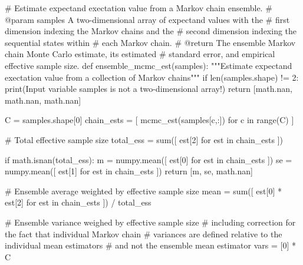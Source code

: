 \documentclass[
  letterpaper,
  DIV=11,
  numbers=noendperiod]{scrartcl}
\newenvironment{Shaded}{\begin{snugshade}}{\end{snugshade}}
\newcommand{\BuiltInTok}[1]{\textcolor[rgb]{0.00,0.23,0.31}{#1}}
\newcommand{\CommentTok}[1]{\textcolor[rgb]{0.37,0.37,0.37}{#1}}
\newcommand{\ControlFlowTok}[1]{\textcolor[rgb]{0.00,0.23,0.31}{#1}}
\newcommand{\DecValTok}[1]{\textcolor[rgb]{0.68,0.00,0.00}{#1}}
\newcommand{\KeywordTok}[1]{\textcolor[rgb]{0.00,0.23,0.31}{#1}}
\newcommand{\NormalTok}[1]{\textcolor[rgb]{0.00,0.23,0.31}{#1}}
\newcommand{\OperatorTok}[1]{\textcolor[rgb]{0.37,0.37,0.37}{#1}}
\newcommand{\StringTok}[1]{\textcolor[rgb]{0.13,0.47,0.30}{#1}}
\begin{document}
\begin{Shaded}
\begin{Highlighting}[]
\CommentTok{\# Estimate expectand exectation value from a Markov chain ensemble.}
\CommentTok{\# @param samples A two{-}dimensional array of expectand values with the }
\CommentTok{\#                first dimension indexing the Markov chains and the }
\CommentTok{\#                second dimension indexing the sequential states within }
\CommentTok{\#                each Markov chain.}
\CommentTok{\# @return The ensemble Markov chain Monte Carlo estimate, its estimated}
\CommentTok{\#         standard error, and empirical effective sample size.}
\KeywordTok{def}\NormalTok{ ensemble\_mcmc\_est(samples):}
  \CommentTok{"""Estimate expectand exectation value from a collection of }
\CommentTok{     Markov chains"""}
  \ControlFlowTok{if} \BuiltInTok{len}\NormalTok{(samples.shape) }\OperatorTok{!=} \DecValTok{2}\NormalTok{:}
    \BuiltInTok{print}\NormalTok{(}\StringTok{\textquotesingle{}Input variable \textasciigrave{}samples\textasciigrave{} is not a two{-}dimensional array!\textquotesingle{}}\NormalTok{)}
    \ControlFlowTok{return}\NormalTok{ [math.nan, math.nan, math.nan]}
    
\NormalTok{  C }\OperatorTok{=}\NormalTok{ samples.shape[}\DecValTok{0}\NormalTok{]}
\NormalTok{  chain\_ests }\OperatorTok{=}\NormalTok{ [ mcmc\_est(samples[c,:]) }\ControlFlowTok{for}\NormalTok{ c }\KeywordTok{in} \BuiltInTok{range}\NormalTok{(C) ]}
  
  \CommentTok{\# Total effective sample size}
\NormalTok{  total\_ess }\OperatorTok{=} \BuiltInTok{sum}\NormalTok{([ est[}\DecValTok{2}\NormalTok{] }\ControlFlowTok{for}\NormalTok{ est }\KeywordTok{in}\NormalTok{ chain\_ests ])}
  
  \ControlFlowTok{if}\NormalTok{ math.isnan(total\_ess):}
\NormalTok{    m  }\OperatorTok{=}\NormalTok{ numpy.mean([ est[}\DecValTok{0}\NormalTok{] }\ControlFlowTok{for}\NormalTok{ est }\KeywordTok{in}\NormalTok{ chain\_ests ])}
\NormalTok{    se }\OperatorTok{=}\NormalTok{ numpy.mean([ est[}\DecValTok{1}\NormalTok{] }\ControlFlowTok{for}\NormalTok{ est }\KeywordTok{in}\NormalTok{ chain\_ests ])}
    \ControlFlowTok{return}\NormalTok{ [m, se, math.nan]}
  
  \CommentTok{\# Ensemble average weighted by effective sample size}
\NormalTok{  mean }\OperatorTok{=} \BuiltInTok{sum}\NormalTok{([ est[}\DecValTok{0}\NormalTok{] }\OperatorTok{*}\NormalTok{ est[}\DecValTok{2}\NormalTok{] }\ControlFlowTok{for}\NormalTok{ est }\KeywordTok{in}\NormalTok{ chain\_ests ]) }\OperatorTok{/}\NormalTok{ total\_ess}

  \CommentTok{\# Ensemble variance weighed by effective sample size}
  \CommentTok{\# including correction for the fact that individual Markov chain}
  \CommentTok{\# variances are defined relative to the individual mean estimators}
  \CommentTok{\# and not the ensemble mean estimator}
  \BuiltInTok{vars} \OperatorTok{=}\NormalTok{ [}\DecValTok{0}\NormalTok{] }\OperatorTok{*}\NormalTok{ C}
  

\end{Highlighting}
\end{Shaded}
\end{document}
